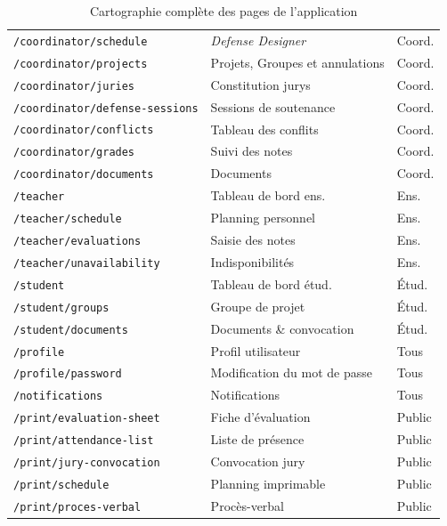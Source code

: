 \begin{table}[H]
\begin{xltabular}{\textwidth}{lXX}
        \texttt{/coordinator/schedule}         & \textit{Defense Designer} & Coord.         \\
        \texttt{/coordinator/projects}         & Projets, Groupes et annulations     & Coord.         \\
        \texttt{/coordinator/juries}           & Constitution jurys        & Coord.         \\
        \texttt{/coordinator/defense-sessions} & Sessions de soutenance    & Coord.         \\
        \texttt{/coordinator/conflicts}        & Tableau des conflits      & Coord.         \\
        \texttt{/coordinator/grades}           & Suivi des notes           & Coord.         \\
        \texttt{/coordinator/documents}        & Documents                 & Coord.         \\
        \midrule
        \texttt{/teacher}                      & Tableau de bord ens.      & Ens.           \\
        \texttt{/teacher/schedule}             & Planning personnel        & Ens.           \\
        \texttt{/teacher/evaluations}          & Saisie des notes          & Ens.           \\
        \texttt{/teacher/unavailability}       & Indisponibilités          & Ens.           \\
        \midrule
        \texttt{/student}                      & Tableau de bord étud.     & Étud.          \\
        \texttt{/student/groups}                & Groupe de projet          & Étud.          \\
        \texttt{/student/documents}            & Documents \& convocation  & Étud.          \\
        \midrule
        \texttt{/profile}                      & Profil utilisateur        & Tous           \\
        \texttt{/profile/password}                & Modification du mot de passe & Tous           \\
        \texttt{/notifications}                & Notifications             & Tous           \\
        \midrule
        \texttt{/print/evaluation-sheet}       & Fiche d'évaluation        & Public         \\
        \texttt{/print/attendance-list}        & Liste de présence         & Public         \\
        \texttt{/print/jury-convocation}       & Convocation jury          & Public         \\
        \texttt{/print/schedule}               & Planning imprimable       & Public         \\
        \texttt{/print/proces-verbal}          & Procès-verbal             & Public         \\
        \bottomrule
    \end{xltabular}
    \caption{Cartographie complète des pages de l'application}
    \label{tab:pages_mapping}
\end{table}

